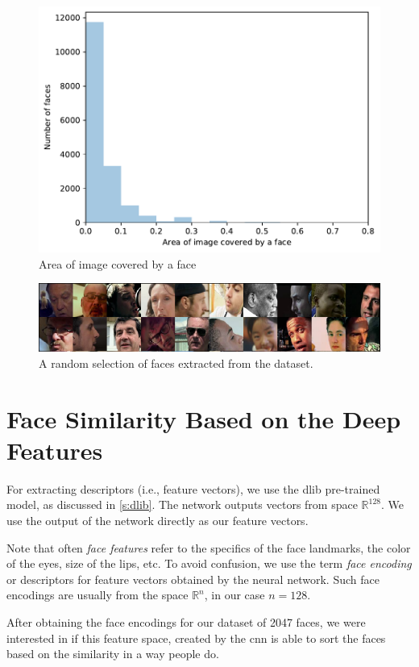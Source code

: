 \begin{figure}
    \centering
    \includegraphics[width=0.7\linewidth]{graphs/faces_size_distribution.pdf}
    \caption{Area of image covered by a face}
    \label{fig:faces_size_distribution}
\end{figure}

\begin{figure}
    \centering
    \includegraphics[width=0.98\linewidth]{img/random_selection_faces.pdf}
    \caption{A random selection of faces extracted from the dataset.}
    \label{fig:random_selection_faces}
\end{figure}

\section{Face Similarity Based on the Deep Features}

For extracting descriptors (i.e., feature vectors), we use the dlib pre-trained model, as discussed in \ref{s:dlib}. The network outputs vectors from space $\mathbb{R}^{128}$. We use the output of the network directly as our feature vectors. 

Note that often \emph{face features} refer to the specifics of the face landmarks, the color of the eyes, size of the lips, etc. To avoid confusion, we use the term \emph{face encoding} or descriptors for feature vectors obtained by the neural network. Such face encodings are usually from the space $\mathbb{R}^n$, in our case $n=128$.

After obtaining the face encodings for our dataset of 2047 faces, we were interested in if this feature space, created by the \acrshort{cnn} is able to sort the faces based on the similarity in a way people do. 

